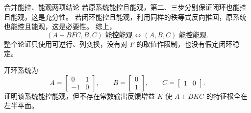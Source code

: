 \documentclass[11pt]{article}
\begin{document}
\begin{solution}
\begin{proofstep}{合并能控、能观两项结论}
若原系统能控且能观，第二、三步分别保证闭环也能控且能观，这是充分性。
若闭环能控且能观，利用同样的秩等式反向推回，原系统也能控且能观，这是必要性。
综上，
\[
\boxed{(A+BFC,B,C)\text{ 能控能观}\iff(A,B,C)\text{ 能控能观}.}
\]
整个论证只使用可逆行、列变换，没有对 $F$ 的取值作限制，也没有假定闭环稳定。
\end{proofstep}
\end{solution}

\begin{problem}[原题 18]
开环系统为
\[
A=\begin{bmatrix}0&1\\-1&0\end{bmatrix},\qquad
B=\begin{bmatrix}0\\1\end{bmatrix},\qquad
C=\begin{bmatrix}1&0\end{bmatrix}.
\]
证明该系统能控能观，但不存在常数输出反馈增益 $K$ 使 $A+BKC$ 的特征根全在左半平面。
\end{problem}
\end{document}
